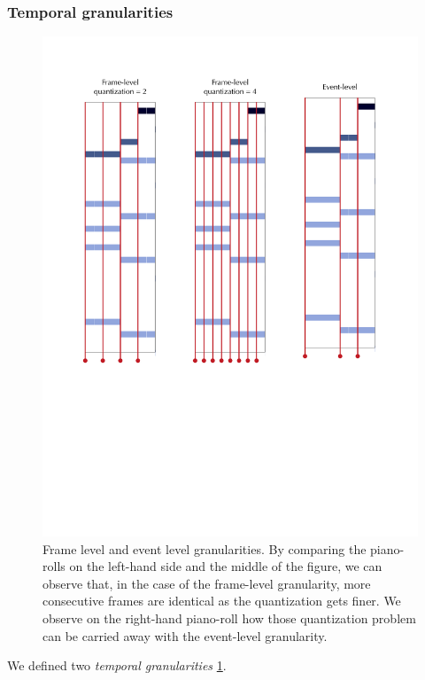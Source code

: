 \documentclass{article}
\begin{document}
\subsubsection{Temporal granularities}
 \begin{figure}
\centering
\includegraphics[scale=0.4]{Data_representation/frame_vs_event}
\caption{Frame level and event level granularities. By comparing the piano-rolls on the left-hand side and the middle of the figure, we can observe that, in the case of the frame-level granularity, more consecutive frames are identical as the quantization gets finer. We observe on the right-hand piano-roll how those quantization problem can be carried away with the event-level granularity.}
\label{fig:frame_vs_event}
\end{figure}
We defined two \textit{temporal granularities} \ref{fig:frame_vs_event}.
\end{document}
